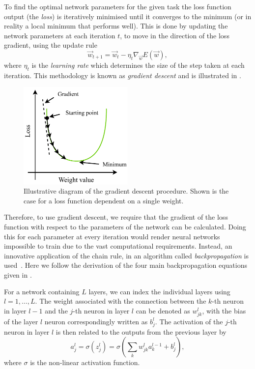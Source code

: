 To find the optimal network parameters for the given task the loss function output (the
\emph{loss}) is iteratively minimised until it converges to the minimum (or in reality a local
minimum that performs well). This is done by updating the network parameters at each iteration
$t$, to move in the direction of the loss gradient, using the update rule
\begin{equation} %
    \vec{w}_{t+1}=\vec{w}_{t}-\eta_{t}\nabla_{\vec{w}}E(\vec{w}),
    \label{eq:update_rule}
\end{equation}
where $\eta_{t}$ is the \emph{learning rate} which determines the size of the step taken at each
iteration. This methodology is known as \emph{gradient descent} and is illustrated in
.

\begin{figure} %
    \includegraphics[width=0.5\textwidth]{diagrams/6-cnn/gradient_descent.pdf}
    \caption[Illustrative diagram of the gradient descent process]
    {Illustrative diagram of the gradient descent procedure. Shown is the case for a loss function
        dependent on a single weight.}
    \label{fig:gradient_descent}
\end{figure}

Therefore, to use gradient descent, we require that the gradient of the loss function with respect
to the parameters of the network can be calculated. Doing this for each parameter at every
iteration would render neural networks impossible to train due to the vast computational
requirements. Instead, an innovative application of the chain rule, in an algorithm called
\emph{backpropagation} is used~\cite{werbos1974}. Here we follow the derivation of the four main
backpropagation equations given in .

For a network containing $L$ layers, we can index the individual layers using $l=1,\dots,L$. The
weight associated with the connection between the $k$-th neuron in layer $l-1$ and the $j$-th
neuron in layer $l$ can be denoted as $w^{l}_{jk}$, with the bias of the layer $l$ neuron
correspondingly written as $b^{l}_{j}$. The activation of the $j$-th neuron in layer $l$ is then
related to the outputs from the previous layer by
\begin{equation} %
    a^{l}_{j}=\sigma(z^{l}_{j})=\sigma\left(\sum_{k}w^{l}_{jk}a^{l-1}_{k}+b^{l}_{j}\right),
    \label{eq:feedforward}
\end{equation}
where $\sigma$ is the non-linear activation function.

